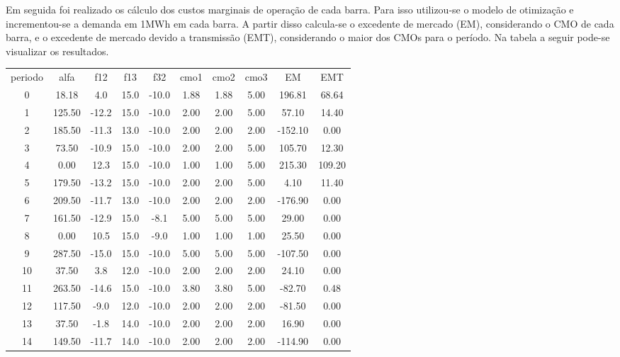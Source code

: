 \documentclass[a4paper,12pt,twoside]{article}
\begin{document}
Em seguida foi realizado os cálculo dos custos marginais de operação de cada barra.
Para isso utilizou-se o modelo de otimização e incrementou-se a demanda em 1MWh em cada barra.
A partir disso calcula-se o excedente de mercado (EM), considerando o CMO de cada barra, e o excedente de mercado devido a transmissão (EMT), considerando o maior dos CMOs para o período.
Na tabela a seguir pode-se visualizar os resultados.

\begin{center}
    \begin{tabular}{ c c c c c c c c c c }
        periodo & alfa   & f12   & f13   & f32  & cmo1  & cmo2  & cmo3        & EM     & EMT \\
        0    & 18.18   & 4.0  & 15.0 & -10.0  & 1.88  & 1.88  & 5.00  & 196.81   & 68.64 \\
        1   & 125.50 & -12.2  & 15.0 & -10.0  & 2.00  & 2.00  & 5.00   & 57.10   & 14.40 \\
        2   & 185.50 & -11.3  & 13.0 & -10.0  & 2.00  & 2.00  & 2.00 & -152.10    & 0.00 \\
        3    & 73.50 & -10.9  & 15.0 & -10.0  & 2.00  & 2.00  & 5.00  & 105.70   & 12.30 \\
        4     & 0.00  & 12.3  & 15.0 & -10.0  & 1.00  & 1.00  & 5.00  & 215.30  & 109.20 \\
        5   & 179.50 & -13.2  & 15.0 & -10.0  & 2.00  & 2.00  & 5.00    & 4.10   & 11.40 \\
        6   & 209.50 & -11.7  & 13.0 & -10.0  & 2.00  & 2.00  & 2.00 & -176.90    & 0.00 \\
        7   & 161.50 & -12.9  & 15.0  & -8.1  & 5.00  & 5.00  & 5.00   & 29.00    & 0.00 \\
        8     & 0.00  & 10.5  & 15.0  & -9.0  & 1.00  & 1.00  & 1.00   & 25.50    & 0.00 \\
        9   & 287.50 & -15.0  & 15.0 & -10.0  & 5.00  & 5.00  & 5.00 & -107.50    & 0.00 \\
        10   & 37.50   & 3.8  & 12.0 & -10.0  & 2.00  & 2.00  & 2.00   & 24.10    & 0.00 \\
        11  & 263.50 & -14.6  & 15.0 & -10.0  & 3.80  & 3.80  & 5.00  & -82.70    & 0.48 \\
        12  & 117.50  & -9.0  & 12.0 & -10.0  & 2.00  & 2.00  & 2.00  & -81.50    & 0.00 \\
        13   & 37.50  & -1.8  & 14.0 & -10.0  & 2.00  & 2.00  & 2.00   & 16.90    & 0.00 \\
        14  & 149.50 & -11.7  & 14.0 & -10.0  & 2.00  & 2.00  & 2.00 & -114.90    & 0.00 \\

\end{tabular}
\end{center}
\end{document}
